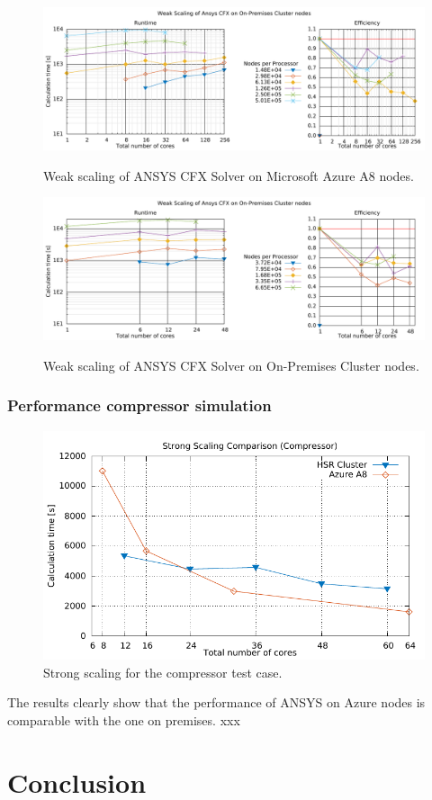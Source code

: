 \documentclass[3p,times]{elsarticle}
\begin{document}
\begin{figure}
	\centering
	\includegraphics[width=.7\linewidth]{gplt-a8-weak-pipe}	
	\label{fig:weakA8}
	\caption{Weak scaling of ANSYS CFX Solver on Microsoft Azure A8 nodes. }
\end{figure}

\begin{figure}
	\centering
	\includegraphics[width=.7\linewidth]{gplt-hsr-weak-pipe}
	\label{fig:weakHSR}
	\caption{Weak scaling of ANSYS CFX Solver on On-Premises Cluster nodes. }
\end{figure}


\subsubsection{Performance compressor simulation}

\begin{figure}
	\centering
	\includegraphics[width=0.5\linewidth]{gplt-compressor}
	\caption{Strong scaling for the compressor test case. }
	\label{fig:stringCompressor}
\end{figure}

The results clearly show that the performance of ANSYS on Azure nodes is comparable with the one on premises.
xxx


 
\section{Conclusion}
\label{sec:conclusions}
\end{document}
